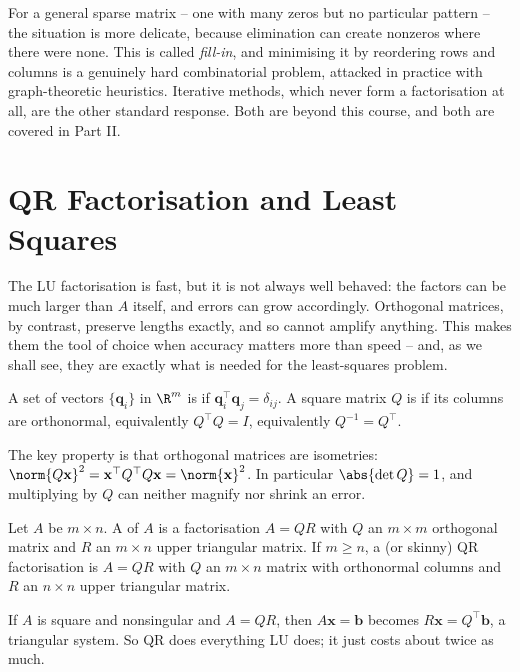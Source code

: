 \begin{remark}
  For a general sparse matrix -- one with many zeros but no particular pattern -- the situation is more delicate, because elimination can create nonzeros where there were none. This is called \emph{fill-in}, and minimising it by reordering rows and columns is a genuinely hard combinatorial problem, attacked in practice with graph-theoretic heuristics. Iterative methods, which never form a factorisation at all, are the other standard response. Both are beyond this course, and both are covered in Part II.
\end{remark}


\section{QR Factorisation and Least Squares}\label{sec:qr}

The LU factorisation is fast, but it is not always well behaved: the factors can be much larger than $A$ itself, and errors can grow accordingly. Orthogonal matrices, by contrast, preserve lengths exactly, and so cannot amplify anything. This makes them the tool of choice when accuracy matters more than speed -- and, as we shall see, they are exactly what is needed for the least-squares problem.

\begin{definition}
  A set of vectors $\{\mathbf{q}_i\}$ in $\R^m$ is  if $\mathbf{q}_i^\top\mathbf{q}_j = \delta_{ij}$. A square matrix $Q$ is  if its columns are orthonormal, equivalently $Q^\top Q = I$, equivalently $Q^{-1} = Q^\top$.
\end{definition}

The key property is that orthogonal matrices are isometries: $\norm{Q\mathbf{x}}^2 = \mathbf{x}^\top Q^\top Q\mathbf{x} = \norm{\mathbf{x}}^2$. In particular $\abs{\det Q} = 1$, and multiplying by $Q$ can neither magnify nor shrink an error.

\begin{definition}[QR Factorisation]
  Let $A$ be $m\times n$. A  of $A$ is a factorisation $A = QR$ with $Q$ an $m\times m$ orthogonal matrix and $R$ an $m\times n$ upper triangular matrix. If $m \geq n$, a  (or skinny) QR factorisation is $A = QR$ with $Q$ an $m\times n$ matrix with orthonormal columns and $R$ an $n\times n$ upper triangular matrix.
\end{definition}

If $A$ is square and nonsingular and $A = QR$, then $A\mathbf{x} = \mathbf{b}$ becomes $R\mathbf{x} = Q^\top\mathbf{b}$, a triangular system. So QR does everything LU does; it just costs about twice as much.

